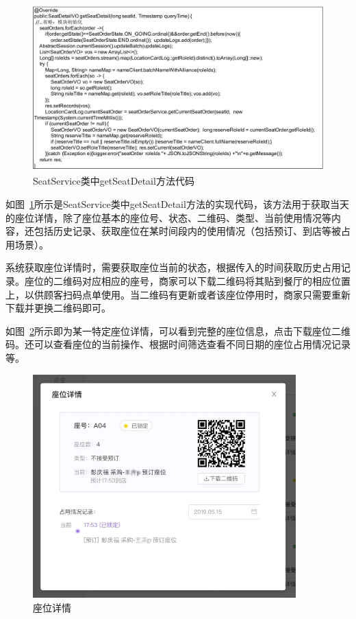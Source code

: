 \begin{figure}[htbp!]
    \centering
    \includegraphics[width=5in]{FIGs/chapter4/10.pdf}
    \caption{SeatService类中getSeatDetail方法代码}\label{fig_seat_10}
\end{figure}

如图~\ref{fig_seat_10}所示是SeatService类中getSeatDetail方法的实现代码，该方法用于获取当天的座位详情，除了座位基本的座位号、状态、二维码、类型、当前使用情况等内容，还包括历史记录、获取座位在某时间段内的使用情况（包括预订、到店等被占用场景）。

系统获取座位详情时，需要获取座位当前的状态，根据传入的时间获取历史占用记录。座位的二维码对应相应的座号，商家可以下载二维码将其贴到餐厅的相应位置上，以供顾客扫码点单使用。当二维码有更新或者该座位停用时，商家只需要重新下载并更换二维码即可。

如图~\ref{fig_seat_detail}所示即为某一特定座位详情，可以看到完整的座位信息，点击下载座位二维码。还可以查看座位的当前操作、根据时间筛选查看不同日期的座位占用情况记录等。

\begin{figure}[htbp!]
    \centering
    \includegraphics[width=4in]{FIGs/chapter4/seat_detail.pdf}
    \caption{座位详情}\label{fig_seat_detail}
\end{figure}

